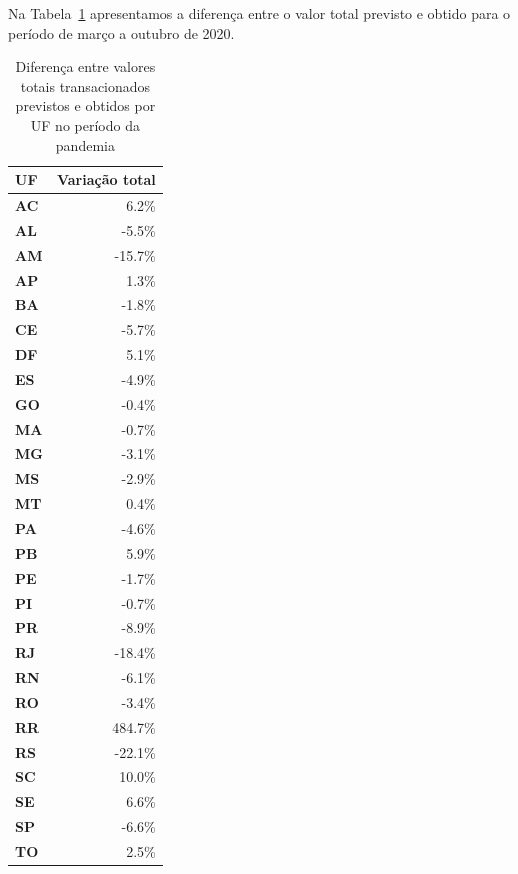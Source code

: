 Na Tabela~\ref{tab:pandemia:variacao-total-por-uf} apresentamos a diferença entre o valor total previsto e obtido para o período de março a outubro de 2020.

\begin{table}[htb]
\centering
\caption{Diferença entre valores totais transacionados previstos e obtidos por UF no período da pandemia}
\label{tab:pandemia:variacao-total-por-uf}
    \begin{tabular}{l|r}
        \toprule
        \textbf{UF} & Variação total \\
        \midrule
        \textbf{AC} &   6.2\% \\
        \textbf{AL} &  -5.5\% \\
        \textbf{AM} & -15.7\% \\
        \textbf{AP} &   1.3\% \\
        \textbf{BA} &  -1.8\% \\
        \textbf{CE} &  -5.7\% \\
        \textbf{DF} &   5.1\% \\
        \textbf{ES} &  -4.9\% \\
        \textbf{GO} &  -0.4\% \\
        \textbf{MA} &  -0.7\% \\
        \textbf{MG} &  -3.1\% \\
        \textbf{MS} &  -2.9\% \\
        \textbf{MT} &   0.4\% \\
        \textbf{PA} &  -4.6\% \\
        \textbf{PB} &   5.9\% \\
        \textbf{PE} &  -1.7\% \\
        \textbf{PI} &  -0.7\% \\
        \textbf{PR} &  -8.9\% \\
        \textbf{RJ} & -18.4\% \\
        \textbf{RN} &  -6.1\% \\
        \textbf{RO} &  -3.4\% \\
        \textbf{RR} & 484.7\% \\
        \textbf{RS} & -22.1\% \\
        \textbf{SC} &  10.0\% \\
        \textbf{SE} &   6.6\% \\
        \textbf{SP} &  -6.6\% \\
        \textbf{TO} &   2.5\% \\
        \bottomrule
    \end{tabular}
\fdadospesquisa
\end{table}

